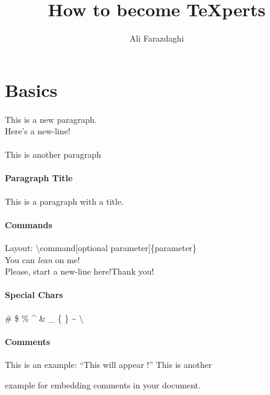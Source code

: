 \documentclass[]{article}
\title{How to become \TeX{}perts} %
\author{Ali Farazdaghi}
\begin{document}
\maketitle

\section{Basics}

\paragraph{}
This is a new paragraph. \\Here's a new-line!

\paragraph{}
This is another paragraph

\paragraph{Paragraph Title}
This is a paragraph with a title.

\paragraph{Commands}
Layout: \textbackslash command[optional parameter]\{parameter\} \\ 
You can \textsl{lean} on me! \\
Please, start a new-line here!\newline Thank you!

\paragraph{Special Chars}
\# \$ \% \^{} \& \_ \{ \} \~{}
\textbackslash

\paragraph{Comments}
This is %
 	an example: ``This will appear%
!''	\newline
This is another
\begin{comment}
rather stupid,
but helpful
\end{comment}
example for embedding comments in your document.
\end{document}
